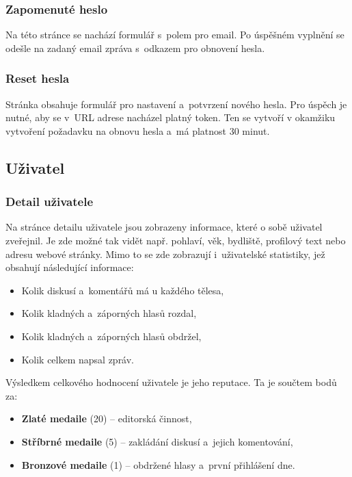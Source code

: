 \documentclass[a4paper,12pt]{article}
\begin{document}
\subsubsection{Zapomenuté heslo}

Na této stránce se nachází formulář s~polem pro email. Po úspěšném vyplnění se odešle na zadaný email zpráva s~odkazem pro obnovení hesla.

\subsubsection{Reset hesla}

Stránka obsahuje formulář pro nastavení a~potvrzení nového hesla. Pro úspěch je nutné, aby se v~URL adrese nacházel platný token. Ten se vytvoří v okamžiku vytvoření požadavku na obnovu hesla a~má platnost 30 minut.

\subsection{Uživatel}

\subsubsection{Detail uživatele}

Na stránce detailu uživatele jsou zobrazeny informace, které o sobě uživatel zveřejnil. Je zde možné tak vidět např. pohlaví, věk, bydliště, profilový text nebo adresu webové stránky. Mimo to se zde zobrazují i~uživatelské statistiky, jež obsahují následující informace:

\begin{itemize}
\item Kolik diskusí a~komentářů má u každého tělesa,
\item Kolik kladných a~záporných hlasů rozdal,
\item Kolik kladných a~záporných hlasů obdržel,
\item Kolik celkem napsal zpráv.
\end{itemize}

Výsledkem celkového hodnocení uživatele je jeho reputace. Ta je součtem bodů za:

\begin{itemize}
\item \textbf{Zlaté medaile} (20) -- editorská činnost,
\item \textbf{Stříbrné medaile} (5) -- zakládání diskusí a~jejich komentování,
\item \textbf{Bronzové medaile} (1) -- obdržené hlasy a~první přihlášení dne.
\end{itemize}
\end{document}
